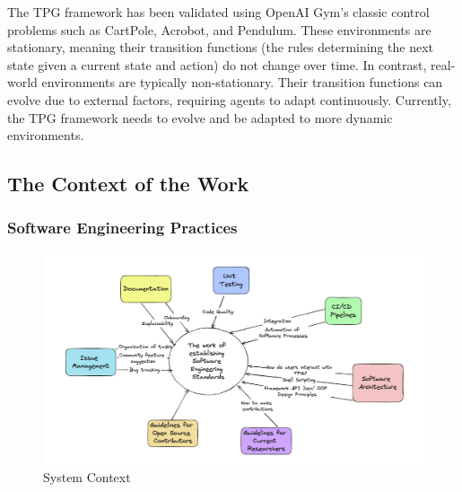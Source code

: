 \documentclass[12pt]{article}
\begin{document}
The TPG framework has been validated using OpenAI Gym's classic control problems such as CartPole, Acrobot, and Pendulum. These environments are stationary, meaning their transition functions (the rules determining the next state given a current state and action) do not change over time.
In contrast, real-world environments are typically non-stationary. Their transition functions can evolve due to external factors, requiring agents to adapt continuously. Currently, the TPG framework needs to evolve and be adapted to more dynamic environments.

\subsection{The Context of the Work}

\subsubsection{Software Engineering Practices}

\begin{figure}[h!]
  \begin{center}
   \includegraphics[scale=0.6]{SystemContext.png}
  \caption{System Context}
  \label{Fig_SystemContext} 
  \end{center}
\end{figure}
\end{document}
